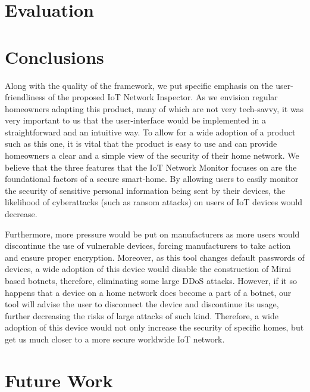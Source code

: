 \section{Evaluation}

\section{Conclusions}
Along with the quality of the framework, we put specific emphasis on the user-friendliness of the proposed IoT Network Inspector. As we envision regular homeowners adapting this product, many of which are not very tech-savvy, it was very important to us that the user-interface would be implemented in a straightforward and an intuitive way. To allow for a wide adoption of a product such as this one, it is vital that the product is easy to use and can provide homeowners a clear and a simple view of the security of their home network.
We believe that the three features that the IoT Network Monitor focuses on are the foundational factors of a secure smart-home. By allowing users to easily monitor the security of sensitive personal information being sent by their devices, the likelihood of cyberattacks (such as ransom attacks) on users of IoT devices would decrease. 

Furthermore, more pressure would be put on manufacturers as more users would discontinue the use of vulnerable devices, forcing manufacturers to take action and ensure proper encryption. Moreover, as this tool changes default passwords of devices, a wide adoption of this device would disable the construction of Mirai based botnets, therefore, eliminating some large DDoS attacks. However, if it so happens that a device on a home network does become a part of a botnet, our tool will advise the user to disconnect the device and discontinue its usage, further decreasing the risks of large attacks of such kind. Therefore, a wide adoption of this device would not only increase the security of specific homes, but get us much closer to a more secure worldwide IoT network.

\section{Future Work}
